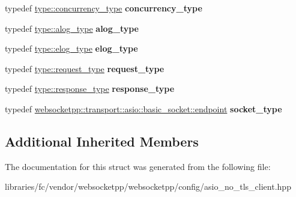 \begin{DoxyCompactItemize}
\item 
\mbox{\label{structwebsocketpp_1_1config_1_1asio__client_1_1transport__config_ad62de38314e78accadf00be8d4fbae67}} 
typedef \mbox{\hyperlink{classwebsocketpp_1_1concurrency_1_1basic}{type\+::concurrency\+\_\+type}} {\bfseries concurrency\+\_\+type}
\item 
\mbox{\label{structwebsocketpp_1_1config_1_1asio__client_1_1transport__config_a0294e35bd4a0110bfe59f6b0acb7c240}} 
typedef \mbox{\hyperlink{classwebsocketpp_1_1log_1_1basic}{type\+::alog\+\_\+type}} {\bfseries alog\+\_\+type}
\item 
\mbox{\label{structwebsocketpp_1_1config_1_1asio__client_1_1transport__config_a9c944b91c2196a8ce6d37c82fc97ef6a}} 
typedef \mbox{\hyperlink{classwebsocketpp_1_1log_1_1basic}{type\+::elog\+\_\+type}} {\bfseries elog\+\_\+type}
\item 
\mbox{\label{structwebsocketpp_1_1config_1_1asio__client_1_1transport__config_aebeda57b20f9cf83ff7edf1991ccbe25}} 
typedef \mbox{\hyperlink{classwebsocketpp_1_1http_1_1parser_1_1request}{type\+::request\+\_\+type}} {\bfseries request\+\_\+type}
\item 
\mbox{\label{structwebsocketpp_1_1config_1_1asio__client_1_1transport__config_a059b73720e41d697f2a3731519f36e38}} 
typedef \mbox{\hyperlink{classwebsocketpp_1_1http_1_1parser_1_1response}{type\+::response\+\_\+type}} {\bfseries response\+\_\+type}
\item 
\mbox{\label{structwebsocketpp_1_1config_1_1asio__client_1_1transport__config_abf6209c3fcb8d3705036441ca16e23c6}} 
typedef \mbox{\hyperlink{classwebsocketpp_1_1transport_1_1asio_1_1basic__socket_1_1endpoint}{websocketpp\+::transport\+::asio\+::basic\+\_\+socket\+::endpoint}} {\bfseries socket\+\_\+type}
\end{DoxyCompactItemize}
\subsection*{Additional Inherited Members}


The documentation for this struct was generated from the following file\+:\begin{DoxyCompactItemize}
\item 
libraries/fc/vendor/websocketpp/websocketpp/config/asio\+\_\+no\+\_\+tls\+\_\+client.\+hpp\end{DoxyCompactItemize}

